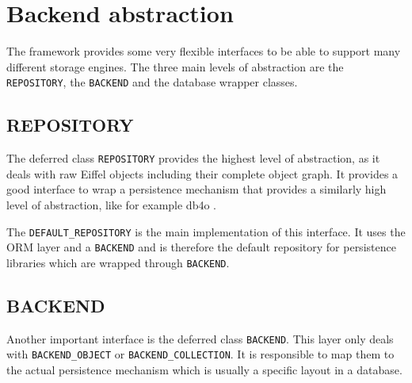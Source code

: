 \documentclass[a4paper,12pt]{report}
\begin{document}
% 
% 

\chapter{Backend abstraction}

The framework provides some very flexible interfaces to be able to support many different storage engines. 
The three main levels of abstraction are the \lstinline!REPOSITORY!, the \lstinline!BACKEND! and the database wrapper classes.

\section{REPOSITORY}

The deferred class \lstinline!REPOSITORY! provides the highest level of abstraction, as it deals with raw Eiffel objects including their complete object graph.
It provides a good interface to wrap a persistence mechanism that provides a similarly high level of abstraction, like for example db4o \cite{db4o}.

The \lstinline!DEFAULT_REPOSITORY! is the main implementation of this interface.
It uses the ORM layer and a \lstinline!BACKEND! and is therefore the default repository for persistence libraries which are wrapped through \lstinline!BACKEND!.

\section{BACKEND}

Another important interface is the deferred class \lstinline!BACKEND!.
This layer only deals with \lstinline!BACKEND_OBJECT! or \lstinline!BACKEND_COLLECTION!.
It is responsible to map them to the actual persistence mechanism which is usually a specific layout in a database.
\end{document}
